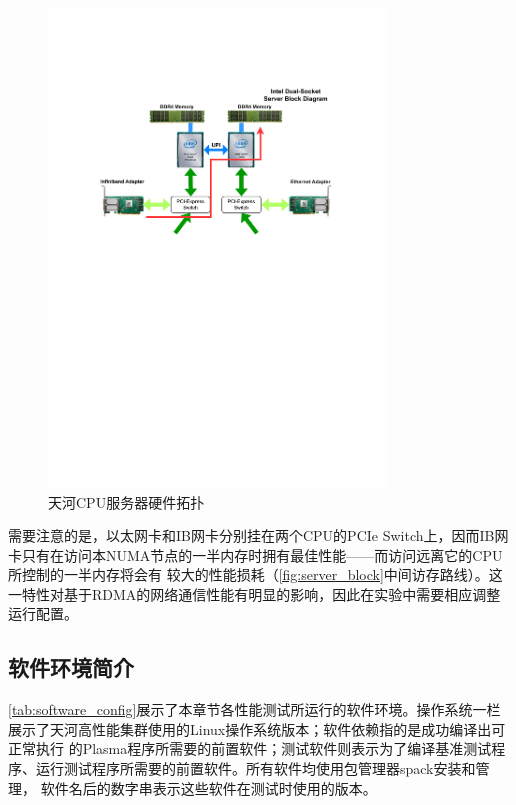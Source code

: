 \begin{figure}[h]
	\centering
	\includegraphics[width=0.8\textwidth]{image/chap04/server_block.pdf}
	\caption{天河CPU服务器硬件拓扑}
	\label{fig:server_block}
\end{figure}

需要注意的是，以太网卡和IB网卡分别挂在两个CPU的PCIe Switch上，因而IB网卡只有在访问本NUMA节点的一半内存时拥有最佳性能——而访问远离它的CPU所控制的一半内存将会有
较大的性能损耗（\autoref{fig:server_block}中间访存路线）。这一特性对基于RDMA的网络通信性能有明显的影响，因此在实验中需要相应调整运行配置。

\subsection{软件环境简介}

\autoref{tab:software_config}展示了本章节各性能测试所运行的软件环境。操作系统一栏展示了天河高性能集群使用的Linux操作系统版本；软件依赖指的是成功编译出可正常执行
的Plasma程序所需要的前置软件；测试软件则表示为了编译基准测试程序、运行测试程序所需要的前置软件。所有软件均使用包管理器spack\cite{gamblin2015spack}安装和管理，
软件名后的数字串表示这些软件在测试时使用的版本。

